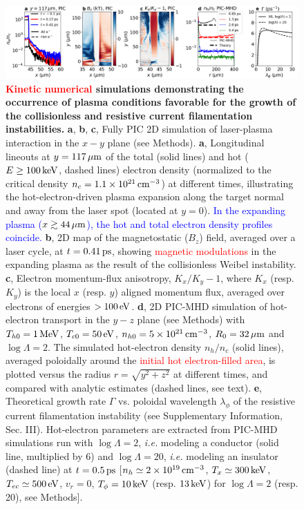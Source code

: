 \documentclass[aps,twocolumn,showpacs,superscriptaddress]{revtex4}
\begin{document}
\begin{figure}[tbh!]
\includegraphics[scale=0.42]{Figure_3_new2.png}
\caption{
\textbf{\textcolor{red}{Kinetic numerical} simulations demonstrating the occurrence of plasma conditions favorable for the growth of the collisionless  and resistive current filamentation instabilities.}
\textbf{a}, \textbf{b}, \textbf{c}, Fully PIC 2D simulation of laser-plasma interaction in the $x-y$ plane (see Methods). 
\textbf{a}, Longitudinal lineouts at $y=117\,\rm \mu m$ of the total (solid lines) and hot ($E \ge 100\,\rm keV$, dashed lines) electron density (normalized to the critical density $n_c =1.1\times 10^{21}\,\rm cm^{-3}$) at different times, illustrating the hot-electron-driven plasma expansion along the target normal and away from the laser spot (located at $y=0$). \textcolor{blue}{In the expanding plasma ($x\gtrsim 44\,\rm \mu m$), the hot and total electron density profiles coincide.}
\textbf{b}, 2D map of the magnetostatic ($B_z$) field,  averaged over a laser cycle, at $t =0.41\,\rm ps$, showing \textcolor{red}{magnetic modulations} in the expanding plasma as the result of the collisionless Weibel instability.
\textbf{c}, Electron momentum-flux anisotropy, $K_x/K_y-1$, where $K_x$ (resp. $K_y$) is the local $x$ (resp. $y$) aligned momentum flux, averaged over electrons of energies $>100\,\rm eV$.
\textbf{d}, 2D PIC-MHD simulation of hot-electron transport in the $y-z$ plane (see Methods) with $T_{h0} = 1\,\rm MeV$, $T_{c0} = 50\,\rm eV$, $n_{h0} = 5 \times 10^{21}\,\rm cm^{-3}$, $R_0 = 32\,\rm \mu m$ and $\log \Lambda =2$. The simulated hot-electron density $n_h/n_c$ (solid lines), averaged poloidally around the \textcolor{red}{initial hot electron-filled area}, is plotted versus the radius $r=\sqrt{y^2+z^2}$ at different times, and compared with analytic estimates (dashed lines, see text).
\textbf{e}, Theoretical growth rate $\Gamma$ vs. poloidal wavelength $\lambda_\phi$ of the resistive current filamentation instability  (see Supplementary Information, Sec. III). Hot-electron parameters are extracted from PIC-MHD simulations run with $\log \Lambda = 2$, \emph{i.e.} modeling a conductor (solid line, multiplied by 6) and $\log \Lambda = 20$, \emph{i.e.} modeling an insulator (dashed line) at $t=0.5\,\rm ps$ [$n_h \simeq 2\times 10^{19}\,\rm cm^{-3}$, $T_x \simeq 300\,\rm keV$, $T_{ec} \simeq 500\,\rm eV$, $v_r=0$,  $T_\phi = 10\,\rm keV$ (resp. $13\,\rm keV$) for $\log \Lambda =2$ (resp. 20), see Methods].}
\label{fig:pic}
\end{figure}
\end{document}
